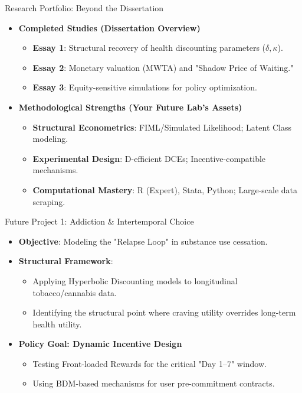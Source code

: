 \documentclass[10pt]{beamer}
\begin{document}
\begin{frame}{Research Portfolio: Beyond the Dissertation}
    \begin{itemize}
        \item \textbf{Completed Studies (Dissertation Overview)}
            \begin{itemize}
                \item \textbf{Essay 1}: Structural recovery of health discounting parameters ($\delta, \kappa$).
                \item \textbf{Essay 2}: Monetary valuation (MWTA) and "Shadow Price of Waiting."
                \item \textbf{Essay 3}: Equity-sensitive simulations for policy optimization.
            \end{itemize}
        \item \textbf{Methodological Strengths (Your Future Lab's Assets)}
            \begin{itemize}
                \item \textbf{Structural Econometrics}: FIML/Simulated Likelihood; Latent Class modeling.
                \item \textbf{Experimental Design}: D-efficient DCEs; Incentive-compatible mechanisms.
                \item \textbf{Computational Mastery}: R (Expert), Stata, Python; Large-scale data scraping.
            \end{itemize}
    \end{itemize}
\end{frame}

\begin{frame}{Future Project 1: Addiction \& Intertemporal Choice}
    \begin{itemize}
        \item \textbf{Objective}: Modeling the "Relapse Loop" in substance use cessation.
        \item \textbf{Structural Framework}:
            \begin{itemize}
                \item Applying \alert{Hyperbolic Discounting} models to longitudinal tobacco/cannabis data.
                \item Identifying the structural point where craving utility overrides long-term health utility.
            \end{itemize}
        \item \textbf{Policy Goal: Dynamic Incentive Design}
            \begin{itemize}
                \item Testing \alert{Front-loaded Rewards} for the critical "Day 1--7" window.
                \item Using BDM-based mechanisms for user pre-commitment contracts.
            \end{itemize}
    \end{itemize}
\end{frame}
\end{document}
